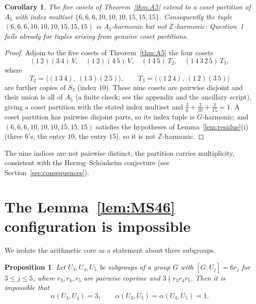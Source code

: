 \documentclass[12pt]{article}
\newtheorem{proposition}[theorem]{Proposition}
\newtheorem{corollary}[theorem]{Corollary}
\theoremstyle{remark}
\newcommand{\Z}{\mathbb{Z}}
\begin{document}
\begin{corollary}\label{cor:partition}
The five cosets of Theorem~\ref{thm:A5} extend to a coset partition of $A_5$ with index multiset $\{6,6,6,10,10,10,15,15,15\}$. Consequently the tuple $(6,6,6,10,10,10,15,15,15)$ is $A_5$-harmonic but not $\Z$-harmonic: Question~1 fails already for tuples arising from genuine coset partitions.
\end{corollary}

\begin{proof}
Adjoin to the five cosets of Theorem~\ref{thm:A5} the four cosets
\[
(1\,2)(3\,4)\,V,\quad (1\,2)(4\,5)\,V,\quad (1\,4\,5)\,T_2,\quad (1\,4\,3\,2\,5)\,T_3,
\]
where
\[
T_2 = \langle (1\,3\,4),\ (1\,3)(2\,5)\rangle,\qquad
T_3 = \langle (1\,2\,4),\ (1\,2)(3\,5)\rangle
\]
are further copies of $S_3$ (index $10$). These nine cosets are pairwise disjoint and their union is all of $A_5$ (a finite check; see the appendix and the ancillary script), giving a coset partition with the stated index multiset and $\tfrac{3}{6}+\tfrac{3}{10}+\tfrac{3}{15}=1$. A coset partition has pairwise disjoint parts, so its index tuple is $G$-harmonic; and $(6,6,6,10,10,10,15,15,15)$ satisfies the hypotheses of Lemma~\ref{lem:residue}(i) (three $6$'s, the entry $10$, the entry $15$), so it is not $\Z$-harmonic.
\end{proof}

The nine indices are not pairwise distinct; the partition carries multiplicity, consistent with the Herzog--Sch\"onheim conjecture (see Section~\ref{sec:consequences}).

\section{The Lemma~\ref{lem:MS46} configuration is impossible}

We isolate the arithmetic core as a statement about three subgroups.

\begin{proposition}\label{prop:triple}
Let $U_3,U_4,U_5$ be subgroups of a group $G$ with $[G:U_j]=6r_j$ for $3\le j\le 5$, where $r_3,r_4,r_5$ are pairwise coprime and $3\nmid r_3r_4r_5$. Then it is impossible that
\[
\alpha(U_3,U_4)=3,\qquad \alpha(U_3,U_5)=\alpha(U_4,U_5)=1.
\]
\end{proposition}
\end{document}
